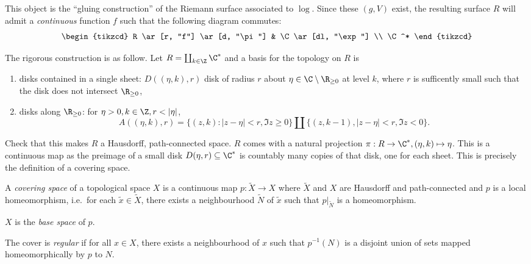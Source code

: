 \documentclass[a4paper]{article}
\begin{document}
\begin{eg}
  This object is the ``gluing construction'' of the Riemann surface associated to \(\log\). Since these \((g, V)\) exist, the resulting surface \(R\) will admit a \emph{continuous} function \(f\) such that the following diagram commutes:
  \[
    \begin{tikzcd}
      R \ar[r, "f"] \ar[d, "\pi"] & \C \ar[dl, "\exp"] \\
      \C^*
    \end{tikzcd}
  \]

  The rigorous construction is as follow. Let \(R = \coprod _{k \in \Z} \C^*\) and a basis for the topology on \(R\) is
  \begin{enumerate}
  \item disks contained in a single sheet: \(D((\eta, k), r)\) disk of radius \(r\) about \(\eta \in \C \setminus \R_{\geq 0}\) at level \(k\), where \(r\) is sufficently small such that the disk does not intersect \(\R_{\geq 0}\),
  \item disks along \(\R_{\geq 0}\): for \(\eta > 0, k \in \Z, r < |\eta|\),
    \[
      A((\eta, k), r) = \{(z, k): |z - \eta| < r, \Im z \geq 0\} \amalg \{(z, k - 1), |z - \eta| < r, \Im z < 0\}.
    \]
  \end{enumerate}

Check that this makes \(R\) a Hausdorff, path-connected space. \(R\) comes with a natural projection \(\pi: R \to \C^*, (\eta, k) \mapsto \eta\). This is a continuous map as the preimage of a small disk \(D(\eta, r) \subseteq \C^*\) is countably many copies of that disk, one for each sheet. This is precisely the definition of a covering space.
\end{eg}

\begin{definition}
  A \emph{covering space} of a topological space \(X\) is a continuous map \(p: \tilde X \to X\) where \(\tilde X\) and \(X\) are Hausdorff and path-connected and \(p\) is a local homeomorphism, i.e.\ for each \(\tilde x \in \tilde X\), there exists a neighbourhood \(\tilde N\) of \(\tilde x\) such that \(p|_{\tilde N}\) is a homeomorphism.

    \(X\) is the \emph{base space} of \(p\).

    The cover is \emph{regular} if for all \(x \in X\), there exists a neighbourhood of \(x\) such that \(p^{-1}(N)\) is a disjoint union of sets mapped homeomorphically by \(p\) to \(N\).
\end{definition}
\end{document}
